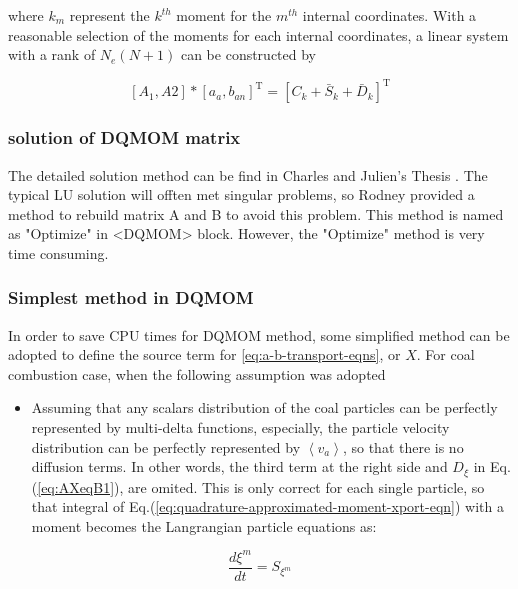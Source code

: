 where $k_m$ represent the $k^{th}$ moment for the $m^{th}$ internal
coordinates. With a reasonable selection of the moments for each internal
coordinates, a linear system with a rank of $N_e\left(N+1\right)$
can be constructed by

\begin{equation} \label{eq:AXeqB1}
[A_{1},A2]*[a_{a},b_{an}]^{\textrm{T}}=[C_{k}+\bar{S}_{k}+\bar{D}_{k}]^{\textrm{T}}
\end{equation}

\subsubsection{solution of DQMOM matrix} \label{subsubsec:solutionax=b}
The detailed solution method can be find in Charles and Julien's Thesis \cite{Charles_DQMOM, Julien_thesis}. The typical LU solution will offten met singular problems, so Rodney provided a method to rebuild matrix A and B to avoid this problem\cite{RF_2009}. This method is named as "Optimize" in <DQMOM> block. However, the "Optimize" method is very time consuming.

\subsubsection{Simplest method in DQMOM} \label{subsubsec:Simplest}
In order to save CPU times for DQMOM method, some simplified method can be adopted to define the source term for \ref{eq:a-b-transport-eqns}, or $X$. For coal combustion case, when the following assumption was adopted
\begin{itemize}
\item Assuming that any scalars distribution of the coal particles can be
perfectly represented by multi-delta functions, especially, the particle
velocity distribution can be perfectly represented by $\left<v_{a}\right>$,
so that there is no diffusion terms. In other words, the third term
at the right side and $D_\xi$ in Eq.(\ref{eq:AXeqB1}),
are omited. This is only correct for each single particle, so that
integral of Eq.(\ref{eq:quadrature-approximated-moment-xport-eqn}) with a
moment becomes the Langrangian particle equations as:
\end{itemize}
\begin{equation}
\frac{d\xi^{m}}{dt}=S_{\xi^{m}}
\end{equation}

